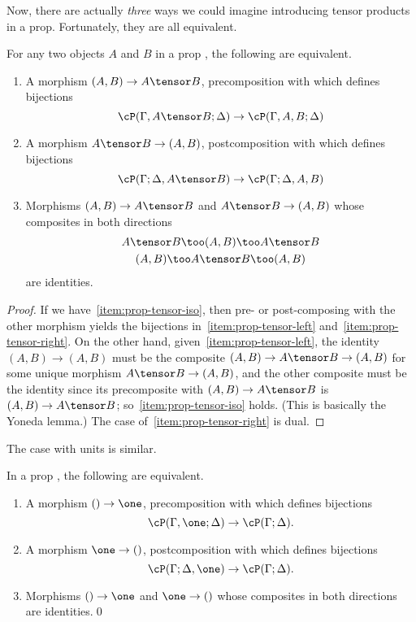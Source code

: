 Now, there are actually \emph{three} ways we could imagine introducing tensor products in a prop.
Fortunately, they are all equivalent.

\begin{lem}\label{thm:prop-tensor}
  For any two objects $A$ and $B$ in a prop \cP, the following are equivalent.
  \begin{enumerate}
  \item A morphism $(A,B) \to A\tensor B$, precomposition with which defines bijections\label{item:prop-tensor-left}
    \[ \cP(\Gamma,A\tensor B;\Delta) \to \cP(\Gamma,A,B;\Delta) \]
  \item A morphism $A\tensor B \to (A,B)$, postcomposition with which defines bijections\label{item:prop-tensor-right}
    \[ \cP(\Gamma;\Delta,A\tensor B) \to \cP(\Gamma;\Delta,A,B) \]
  \item Morphisms $(A,B) \to A\tensor B$ and $A\tensor B \to (A,B)$ whose composites in both directions
    \begin{gather*}
      A\tensor B \too (A,B)  \too A\tensor B\\
      (A,B)\too A\tensor B \too (A,B)
    \end{gather*}
    are identities.\label{item:prop-tensor-iso}
  \end{enumerate}
\end{lem}
\begin{proof}
  If we have~\ref{item:prop-tensor-iso}, then pre- or post-composing with the other morphism yields the bijections in~\ref{item:prop-tensor-left} and~\ref{item:prop-tensor-right}.
  On the other hand, given~\ref{item:prop-tensor-left}, the identity $(A,B)\to (A,B)$ must be the composite $(A,B)\to A\tensor B \to (A,B)$ for some unique morphism $A\tensor B \to (A,B)$, and the other composite must be the identity since its precomposite with $(A,B)\to A\tensor B$ is $(A,B)\to A\tensor B$; so~\ref{item:prop-tensor-iso} holds.
  (This is basically the Yoneda lemma.)
  The case of~\ref{item:prop-tensor-right} is dual.
\end{proof}

The case with units is similar.

\begin{lem}\label{thm:prop-unit}
  In a prop \cP, the following are equivalent.
  \begin{enumerate}
  \item A morphism $()\to \one$, precomposition with which defines bijections
    \[\cP(\Gamma,\one;\Delta) \to \cP(\Gamma;\Delta).\]
  \item A morphism $\one\to()$, postcomposition with which defines bijections
    \[\cP(\Gamma;\Delta,\one) \to \cP(\Gamma;\Delta).\]
  \item Morphisms $()\to \one$ and $\one\to()$ whose composites in both directions are identities.\qed
  \end{enumerate}
\end{lem}

